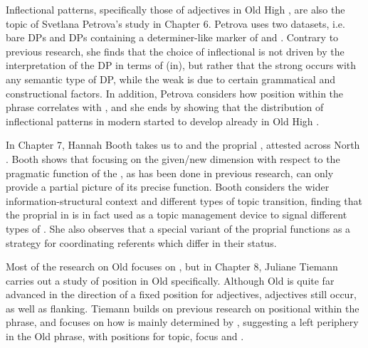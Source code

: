 \begin{refsection}
Inflectional patterns, specifically those of  adjectives in Old High , are also the topic of Svetlana Petrova’s study in Chapter 6. Petrova uses two datasets, i.e. bare DPs and DPs containing a determiner-like marker of  and . Contrary to previous research, she finds that the choice of inflectional  is not driven by the interpretation of the DP in terms of (in), but rather that the strong  occurs with any semantic type of DP, while the weak  is due to certain grammatical and constructional factors. In addition, Petrova considers how position within the  phrase correlates with , and she ends by showing that the distribution of inflectional patterns in modern  started to develop already in Old High . 

In Chapter 7, Hannah Booth takes us to  and the proprial , attested across North . Booth shows that focusing on the given/new dimension with respect to the pragmatic function of the , as has been done in previous research, can only provide a partial picture of its precise function. Booth considers the wider information-structural context and different types of topic transition, finding that the proprial  in  is in fact used as a topic management device to signal different types of . She also observes that a special variant of the proprial  functions as a strategy for coordinating referents which differ in their  status. 

Most of the research on Old  focuses on , but in Chapter 8, Juliane Tiemann carries out a study of  position in Old  specifically. Although Old  is quite far advanced in the direction of a fixed  position for adjectives,  adjectives still occur, as well as  flanking. Tiemann builds on previous research on positional  within the  phrase, and focuses on how  is mainly determined by , suggesting a left periphery in the Old   phrase, with positions for topic, focus and . 


\end{refsection}
